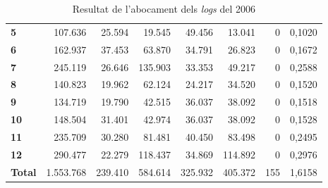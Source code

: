 \begin{table}[h!]
\begin{adjustbox}{width=1.5\textwidth, center}
\begin{tabular}{|l|r|r|r|r|r|r|r|}
            \midrule
            \textbf{5}     & 107.636      & 25.594     & 19.545     & 49.456     & 13.041     & 0            & 0,1020          \\
            \textbf{6}     & 162.937      & 37.453     & 63.870     & 34.791     & 26.823     & 0            & 0,1672          \\
            \textbf{7}     & 245.119      & 26.646     & 135.903    & 33.353     & 49.217     & 0            & 0,2588          \\
            \textbf{8}     & 140.823      & 19.962     & 62.124     & 24.217     & 34.520     & 0            & 0,1520          \\
            \midrule
            \textbf{9}     & 134.719      & 19.790     & 42.515     & 36.037     & 38.092     & 0            & 0,1518          \\
            \textbf{10}    & 148.504      & 31.401     & 42.974     & 36.037     & 38.092     & 0            & 0,1528          \\
            \textbf{11}    & 235.709      & 30.280     & 81.481     & 40.450     & 83.498     & 0            & 0,2495          \\
            \textbf{12}    & 290.477      & 22.279     & 118.437    & 34.869     & 114.892    & 0            & 0,2976          \\
            \midrule
            \textbf{Total} & 1.553.768    & 239.410    & 584.614    & 325.932    & 405.372    & 155          & 1,6158          \\
            \bottomrule
        \end{tabular}
    \end{adjustbox}
    \caption{Resultat de l'abocament dels \textit{logs} del 2006}
    \label{tab:logs-table-2006}
\end{table}

